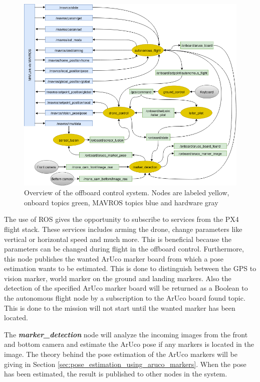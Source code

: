 \documentclass[../Head/report.tex]{subfiles}
\begin{document}
\begin{figure}[H]
    \centering
    \includegraphics[width=0.95\linewidth]{../Figures/node_communication.png}
    \caption{Overview of the offboard control system. Nodes are labeled yellow, onboard topics green, MAVROS topics blue and hardware gray}
    \label{fig:offboard_control}
\end{figure}

The use of ROS gives the opportunity to subscribe to services from the PX4 flight stack. These services includes arming the drone, change parameters like vertical or horizontal speed and much more. This is beneficial because the parameters can be changed during flight in the offboard control. Furthermore, this node publishes the wanted ArUco marker board from which a pose estimation wants to be estimated. This is done to distinguish between the GPS to vision marker, world marker on the ground and landing markers. Also the detection of the specified ArUco marker board will be returned as a Boolean to the autonomous flight node by a subscription to the ArUco board found topic. This is done to the mission will not start until the wanted marker has been located.  

The \textit{\textbf{marker\_detection}} node will analyze the incoming images from the front and bottom camera and estimate the ArUco pose if any markers is located in the image. The theory behind the pose estimation of the ArUco markers will be giving in Section \ref{sec:pose_estimation_using_aruco_markers}. When the pose has been estimated, the result is published to other nodes in the system.
\end{document}
